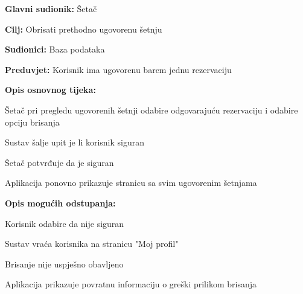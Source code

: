 					
					
					
					
						\noindent {}
					\begin{packed_item}
	
						\item \textbf{Glavni sudionik:} Šetač
						\item  \textbf{Cilj:} Obrisati prethodno ugovorenu šetnju
						\item  \textbf{Sudionici:} Baza podataka
						\item  \textbf{Preduvjet:} Korisnik ima ugovorenu barem jednu rezervaciju 
						\item  \textbf{Opis osnovnog tijeka:}
						
						\item[] \begin{packed_enum}
							\item Šetač pri pregledu ugovorenih šetnji odabire odgovarajuću rezervaciju i odabire opciju brisanja
							\item Sustav šalje upit je li korisnik siguran
							\item Šetač potvrđuje da je siguran
							\item Aplikacija ponovno prikazuje stranicu sa svim ugovorenim šetnjama
						
						\end{packed_enum}
						\item  \textbf{Opis mogućih odstupanja:}
						
						\item[] \begin{packed_item}
							\item[3.a] Korisnik odabire da nije siguran
							\item[] \begin{packed_enum}
								\item Sustav vraća korisnika na stranicu "Moj profil"
							\end{packed_enum}
	                        \item[4.a] Brisanje nije uspješno obavljeno
	                        \item[] \begin{packed_enum}
								\item Aplikacija prikazuje povratnu informaciju o greški prilikom brisanja
							\end{packed_enum}
						\end{packed_item}
					\end{packed_item}
					
